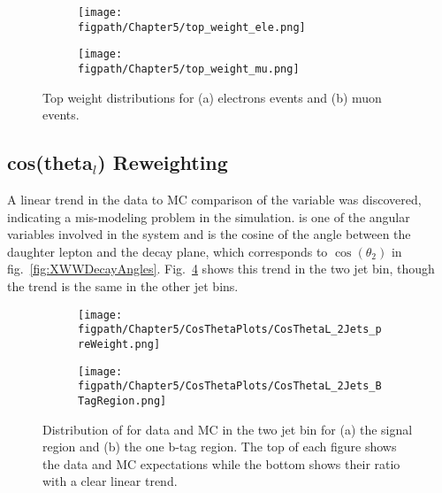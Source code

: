 \begin{figure}[!hbt]
    \centering
    \begin{subfigure}[t]{0.48\textwidth}
      \texttt{[image: \\figpath/Chapter5/top\_weight\_ele.png]}
      \caption{}
      \label{fig:top_pt_weights_ele}
    \end{subfigure}
    \begin{subfigure}[t]{0.48\textwidth}
      \texttt{[image: \\figpath/Chapter5/top\_weight\_mu.png]}
      \caption{}
      \label{fig:top_pt_weights_mu}
    \end{subfigure}
    \caption{Top \pt weight distributions for (a) electrons events and (b) muon events.}
    \label{fig:top_pt_weights}
\end{figure}

\subsection{\texorpdfstring{cos(theta$_l$)}{CosThetaL} Reweighting}

A linear trend in the data to MC comparison of the \costhetal variable was discovered, indicating a mis-modeling problem in the simulation.
\costhetal is one of the angular variables involved in the \WW system and is the cosine of the angle between the daughter lepton and the \WW decay plane, which corresponds to $\cos\left(\theta_{2}\right)$ in fig.~\ref{fig:XWWDecayAngles}.
Fig.~\ref{fig:cos_theta_l_preweight_signal} shows this trend in the two jet bin, though the trend is the same in the other jet bins.

\begin{figure}[!hbt]
    \centering
    \begin{subfigure}[t]{0.48\textwidth}
      \texttt{[image: \\figpath/Chapter5/CosThetaPlots/CosThetaL\_2Jets\_preWeight.png]}
      \caption{}
      \label{fig:cos_theta_l_preweight_signal}
    \end{subfigure}
    \begin{subfigure}[t]{0.48\textwidth}
      \texttt{[image: \\figpath/Chapter5/CosThetaPlots/CosThetaL\_2Jets\_BTagRegion.png]}
      \caption{}
      \label{fig:cos_theta_l_preweight_1btag}
    \end{subfigure}
    \caption{Distribution of \costhetal for data and MC in the two jet bin for (a) the signal region and (b) the one b-tag region. The top of each figure shows the data and MC expectations while the bottom shows their ratio with a clear linear trend.}
    \label{fig:cos_theta_l_preweight}
\end{figure}

